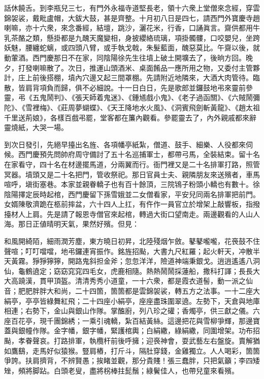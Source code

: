 話休饒舌。到李瓶兒三七，有門外永福寺道堅長老，領十六衆上堂僧來念經，穿雲錦袈裟，戴毗盧帽，大鈸大鼓，甚是齊整。{}十月初八日是四七，請西門外寶慶寺趙喇嘛，亦十六衆，來念番經，結壇，跳沙，灑花米，行香，口誦眞言。齋供都用牛乳茶酪之類，懸掛都是九醜天魔變相，身披纓絡琉璃，項掛髑髏，口咬嬰兒，坐跨妖魅，腰纏蛇螭，或四頭八臂，或手執戈戟，朱髮藍面，醜惡莫比。午齋以後，就動葷酒。西門慶那日不在家，同陰陽徐先生往墳上破土開壙去了，後晌方回。晚夕，打發喇嘛散了。次日，推運山頭酒米、桌面餚品一應所用之物，又委付主管夥計，庄上前後搭棚，墳內穴邊又起三間罩棚。先請附近地隣來，大酒大肉管待。臨散，皆肩背項負而歸，{}俱不必細說。十一日白日，先是歌郎並鑼鼓地弔來靈前參靈，弔《五鬼鬧判》、《張天師着鬼迷》、《鍾馗戲小鬼》、《老子過函關》、《六賊鬧彌陀》、《雪裡梅》、《莊周夢蝴蝶》、《天王降地水火風》、《洞賓飛劍斬黃龍》、《趙太祖千里送荊娘》，各樣百戲弔罷，堂客都在簾內觀看。參罷靈去了，內外親戚都來辭靈燒紙，大哭一場。

到次日發引，先絕早擡出名旌、各項幡亭紙紮，僧道、鼓手、細樂、人役都來伺候。西門慶預先問帥府周守備討了五十名巡捕軍士，都帶弓馬，全裝結束。留十名在家看守，四十名在材邊擺馬道，分兩翼而行。衙門裡又是二十名排軍打路，照管冥器。墳頭又是二十名把門，管收祭祀。那日官員士夫、親隣朋友來送殯者，車馬喧呼，塡街塞巷。本家並親眷轎子也有百十餘頂，三院鴇子粉頭小轎也有數十。徐陰陽擇定辰時起棺，西門慶留下孫雪娥並二女僧看家，平安兒同兩名排軍把前門。女婿陳敬濟跪在柩前摔盆，{}六十四人上扛，有仵作一員官立於增架上敲響板，指撥擡材人上肩。先是請了報恩寺僧官來起棺，轉過大街口望南走。兩邊觀看的人山人海。那日正値晴明天氣，果然好殯。但見：

\begin{myquote}
和風開綺陌，細雨潤芳塵，東方曉日初昇，北陸殘烟乍斂。鼕鼕嚨嚨，花䘮鼓不住聲喧；叮叮噹噹，地弔鑼連宵振作。銘旌招颭，大書九尺紅羅；起火軒天，冲散半天黃霧。猙猙獰獰，開路鬼斜担金斧；忽忽洋洋，險道神端秉銀戈。逍逍遙遙八洞仙，龜鶴遶定；窈窈窕窕四毛女，虎鹿相隨。熱熱鬧鬧採蓮船，撒科打諢；長長大大高蹺漢，貫甲頂盔。清清秀秀小道童，一十六衆，都是霞衣道髻，動一派之仙音；肥肥胖胖大和尚，二十四箇，箇箇都是雲錦袈裟，轉五方之法事。一十二座大絹亭，亭亭皆綠舞紅飛；二十四座小絹亭，座座盡珠圍翠遶。左勢下，天倉與地庫相連；右勢下，金山與銀山作隊。掌醢廚，列八珍之礶；香燭亭，供三獻之儀。六座百花亭，現千團錦綉；一乘引魂轎，紮百結黃絲。這邊把花與雪柳爭輝，那邊寶蓋與銀幢作隊。金字幡，銀字幡，緊護棺輿；白絹繖，綠絹繖，同圍增架。功布招颭，孝眷聲哀。打路排軍，執欖杆前後呼擁；迎䘮神會，耍武藝左右盤旋。賣解猶如鷹鷂，走馬好似猿猴。豎肩樁，打斤斗，隔肚穿錢，金雞獨立。人人喝彩，箇箇爭誇。扶肩擠背，不辨賢愚；挨睹並觀，那分貴賤！張三蠢胖，只把氣籲；李四矮矬，頻將脚跕。白頭老叟，盡將柺棒拄髭鬚；綠鬢佳人，也帶兒童來看殯。
\end{myquote}

